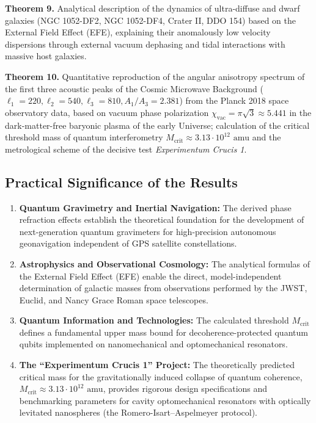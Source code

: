 \documentclass[11pt,a4paper]{article}
\theoremstyle{definition}
\begin{document}
\textbf{Theorem 9.} Analytical description of the dynamics of ultra-diffuse and dwarf galaxies (NGC 1052-DF2, NGC 1052-DF4, Crater II, DDO 154) based on the External Field Effect (EFE), explaining their anomalously low velocity dispersions through external vacuum dephasing and tidal interactions with massive host galaxies.

\textbf{Theorem 10.} Quantitative reproduction of the angular anisotropy spectrum of the first three acoustic peaks of the Cosmic Microwave Background ($\ell_1=220, \ell_2=540, \ell_3=810, A_1/A_3=2.381$) from the Planck 2018 space observatory data, based on vacuum phase polarization $\chi_{\text{vac}} = \pi\sqrt{3} \approx 5.441$ in the dark-matter-free baryonic plasma of the early Universe; calculation of the critical threshold mass of quantum interferometry $M_{\text{crit}} \approx 3.13 \cdot 10^{12}\text{ amu}$ and the metrological scheme of the decisive test \textit{Experimentum Crucis 1}.

\subsection{Practical Significance of the Results}\label{subsec:significance}

\begin{enumerate}
\item \textbf{Quantum Gravimetry and Inertial Navigation:} The derived phase refraction effects establish the theoretical foundation for the development of next-generation quantum gravimeters for high-precision autonomous geonavigation independent of GPS satellite constellations.
\item \textbf{Astrophysics and Observational Cosmology:} The analytical formulas of the External Field Effect (EFE) enable the direct, model-independent determination of galactic masses from observations performed by the JWST, Euclid, and Nancy Grace Roman space telescopes.
\item \textbf{Quantum Information and Technologies:} The calculated threshold $M_{\text{crit}}$ defines a fundamental upper mass bound for decoherence-protected quantum qubits implemented on nanomechanical and optomechanical resonators.
\item \textbf{The ``Experimentum Crucis 1'' Project:} The theoretically predicted critical mass for the gravitationally induced collapse of quantum coherence, $M_{\text{crit}} \approx 3.13 \cdot 10^{12}\text{ amu}$, provides rigorous design specifications and benchmarking parameters for cavity optomechanical resonators with optically levitated nanospheres (the Romero-Isart--Aspelmeyer protocol).
\end{enumerate}
\end{document}
